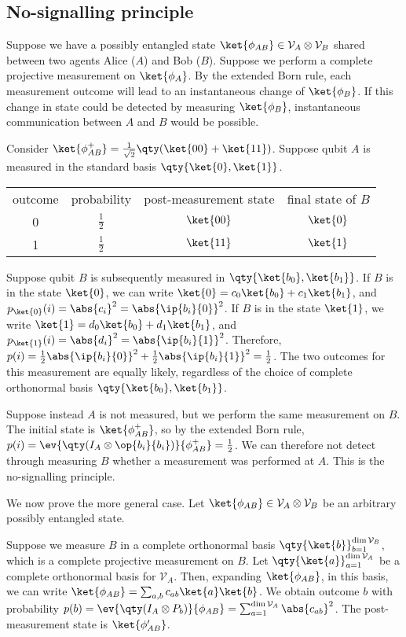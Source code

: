 \subsection{No-signalling principle}
Suppose we have a possibly entangled state $\ket{\phi_{AB}} \in \mathcal V_A \otimes \mathcal V_B$ shared between two agents Alice ($A$) and Bob ($B$).
Suppose we perform a complete projective measurement on $\ket{\phi_A}$.
By the extended Born rule, each measurement outcome will lead to an instantaneous change of $\ket{\phi_B}$.
If this change in state could be detected by measuring $\ket{\phi_B}$, instantaneous communication between $A$ and $B$ would be possible.

Consider $\ket{\phi_{AB}^+} = \frac{1}{\sqrt{2}}\qty(\ket{00} + \ket{11})$.
Suppose qubit $A$ is measured in the standard basis $\qty{\ket{0}, \ket{1}}$.
\begin{center}
    \begin{tabular}{c c c c}
        outcome & probability & post-measurement state & final state of $B$ \\
        0 & $\frac{1}{2}$ & $\ket{00}$ & $\ket{0}$ \\
        1 & $\frac{1}{2}$ & $\ket{11}$ & $\ket{1}$
    \end{tabular}
\end{center}
Suppose qubit $B$ is subsequently measured in $\qty{\ket{b_0}, \ket{b_1}}$.
If $B$ is in the state $\ket{0}$, we can write $\ket{0} = c_0\ket{b_0} + c_1\ket{b_1}$, and $p_{\ket{0}}(i) = \abs{c_i}^2 = \abs{\ip{b_i}{0}}^2$.
If $B$ is in the state $\ket{1}$, we write $\ket{1} = d_0\ket{b_0} + d_1\ket{b_1}$, and $p_{\ket{1}}(i) = \abs{d_i}^2 = \abs{\ip{b_i}{1}}^2$.
Therefore, $p(i) = \frac{1}{2} \abs{\ip{b_i}{0}}^2 + \frac{1}{2} \abs{\ip{b_i}{1}}^2 = \frac{1}{2}$.
The two outcomes for this measurement are equally likely, regardless of the choice of complete orthonormal basis $\qty{\ket{b_0}, \ket{b_1}}$.

Suppose instead $A$ is not measured, but we perform the same measurement on $B$.
The initial state is $\ket{\phi_{AB}^+}$, so by the extended Born rule, $p(i) = \ev{\qty(I_A \otimes \op{b_i}{b_i})}{\phi_{AB}^+} = \frac{1}{2}$.
We can therefore not detect through measuring $B$ whether a measurement was performed at $A$.
This is the no-signalling principle.

We now prove the more general case.
Let $\ket{\phi_{AB}} \in \mathcal V_A \otimes \mathcal V_B$ be an arbitrary possibly entangled state.

Suppose we measure $B$ in a complete orthonormal basis $\qty{\ket{b}}_{b=1}^{\dim \mathcal V_B}$, which is a complete projective measurement on $B$.
Let $\qty{\ket{a}}_{a=1}^{\dim \mathcal V_A}$ be a complete orthonormal basis for $\mathcal V_A$.
Then, expanding $\ket{\phi_{AB}}$, in this basis, we can write $\ket{\phi_{AB}} = \sum_{a,b} c_{ab} \ket{a} \ket{b}$.
We obtain outcome $b$ with probability $p(b) = \ev{\qty(I_A \otimes P_b)}{\phi_{AB}} = \sum_{a=1}^{\dim \mathcal V_A} \abs{c_{ab}}^2$.
The post-measurement state is $\ket{\phi_{AB}'}$.

